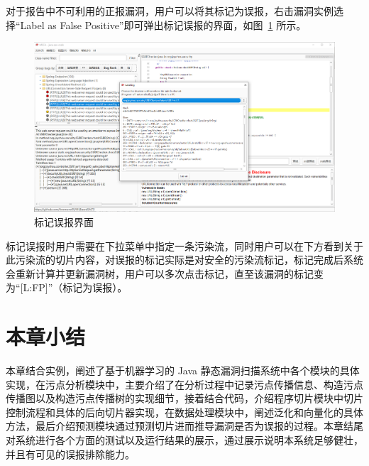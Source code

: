 对于报告中不可利用的正报漏洞，用户可以将其标记为误报，右击漏洞实例选择“Label as False Positive”即可弹出标记误报的界面，如图~\ref{show:labelFP} 所示。

\begin{figure}[H]
    \centering
    \includegraphics[width=0.8\linewidth]{FIGs/chapter4/labelFP.png}
    \caption{标记误报界面}\label{show:labelFP}
\end{figure}


标记误报时用户需要在下拉菜单中指定一条污染流，同时用户可以在下方看到关于此污染流的切片内容，对误报的标记实际是对安全的污染流标记，标记完成后系统会重新计算并更新漏洞树，用户可以多次点击标记，直至该漏洞的标记变为“[L:FP]”（标记为误报）。

\section{本章小结}

本章结合实例，阐述了基于机器学习的 Java 静态漏洞扫描系统中各个模块的具体实现，在污点分析模块中，主要介绍了在分析过程中记录污点传播信息、构造污点传播图以及构造污点传播树的实现细节，接着结合代码，介绍程序切片模块中切片控制流程和具体的后向切片器实现，在数据处理模块中，阐述泛化和向量化的具体方法，最后介绍预测模块通过预测切片进而推导漏洞是否为误报的过程。本章结尾对系统进行各个方面的测试以及运行结果的展示，通过展示说明本系统足够健壮，并且有可见的误报排除能力。


